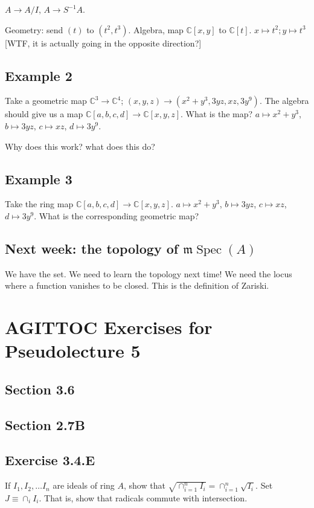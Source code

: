 \documentclass{book}
\newcommand{\C}{\ensuremath{\mathbb{C}}}
\newcommand{\m}{\mathfrak{m}}
\newcommand{\mspec}{\m\operatorname{Spec}}
\theoremstyle{definition}
\begin{document}
$A \rightarrow A/I$, $A \rightarrow S^{-1} A$.

Geometry: send $(t)$ to $(t^2, t^3)$. Algebra, map $\C[x, y]$ to $\C[t]$.
$x \mapsto t^2; y \mapsto t^3$ [WTF, it is actually going in the opposite direction?]

\section{Example 2}
Take a geometric map $\C^3 \rightarrow \C^4$; $(x, y, z) \rightarrow (x^2 + y^3, 3yz, xz, 3y^9)$.
The algebra should give us a map $\C[a, b, c, d] \rightarrow \C[x, y, z]$. What 
is the map? $a \mapsto x^2 + y^3$, $b \mapsto 3yz$, $c \mapsto xz$, $d \mapsto 3y^9$.

Why does this work? what does this do?


\section{Example 3}
Take the ring map 
$\C[a, b, c, d] \rightarrow \C[x, y, z]$. $a \mapsto x^2 + y^3$, $b \mapsto 3yz$, $c \mapsto xz$, $d \mapsto 3y^9$. 
What is the corresponding geometric map?

\section{Next week: the topology of $\mspec(A)$}

We have the set. We need to learn the topology next time! We need the
locus where a function vanishes to be closed. This is the definition of Zariski.

\chapter{AGITTOC Exercises for Pseudolecture 5}

\section{Section 3.6}
\section{Section 2.7B}
\section{Exercise 3.4.E}
If $I_1, I_2, \dots I_n$ are ideals of ring $A$, show that $\sqrt{\cap_{i=1}^n I_i} = \cap_{i=1}^n \sqrt{I_i}$.
Set $J \equiv \cap_i I_i$.  That is, show that radicals commute with intersection.
\end{document}
